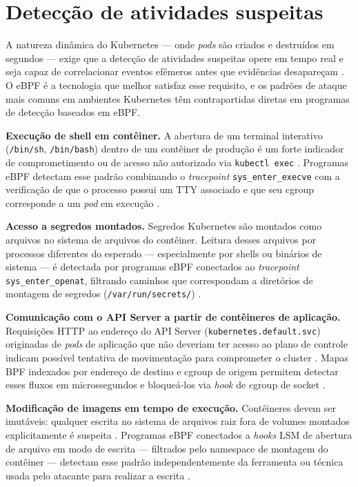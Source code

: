 \section{Detecção de atividades suspeitas}

A natureza dinâmica do Kubernetes — onde \textit{pods} são criados e destruídos
em segundos — exige que a detecção de atividades suspeitas opere em tempo real e
seja capaz de correlacionar eventos efêmeros antes que evidências desapareçam
\cite{majors2022}.
O eBPF é a tecnologia que melhor satisfaz esse requisito, e os padrões de ataque
mais comuns em ambientes Kubernetes têm contrapartidas diretas em programas de
detecção baseados em eBPF.

\textbf{Execução de shell em contêiner.}
A abertura de um terminal interativo (\texttt{/bin/sh}, \texttt{/bin/bash})
dentro de um contêiner de produção é um forte indicador de comprometimento ou
de acesso não autorizado via \texttt{kubectl exec} \cite{cassagnes2020}.
Programas eBPF detectam esse padrão combinando o \textit{tracepoint}
\texttt{sys\_enter\_execve} com a verificação de que o processo possui um TTY
associado e que seu cgroup corresponde a um \textit{pod} em execução
\cite{linuxkernel2024}.

\textbf{Acesso a segredos montados.}
Segredos Kubernetes são montados como arquivos no sistema de arquivos do contêiner.
Leitura desses arquivos por processos diferentes do esperado — especialmente por
shells ou binários de sistema — é detectada por programas eBPF conectados ao
\textit{tracepoint} \texttt{sys\_enter\_openat}, filtrando caminhos que
correspondam a diretórios de montagem de segredos (\texttt{/var/run/secrets/})
\cite{gregg2019}.

\textbf{Comunicação com o API Server a partir de contêineres de aplicação.}
Requisições HTTP ao endereço do API Server (\texttt{kubernetes.default.svc})
originadas de \textit{pods} de aplicação que não deveriam ter acesso ao plano
de controle indicam possível tentativa de movimentação para comprometer o cluster
\cite{beyer2016}.
Mapas BPF indexados por endereço de destino e cgroup de origem permitem detectar
esses fluxos em microssegundos e bloqueá-los via \textit{hook} de cgroup de socket
\cite{linuxkernel2024}.

\textbf{Modificação de imagens em tempo de execução.}
Contêineres devem ser imutáveis: qualquer escrita no sistema de arquivos raiz
fora de volumes montados explicitamente é suspeita \cite{gregg2020}.
Programas eBPF conectados a \textit{hooks} LSM de abertura de arquivo em modo de
escrita — filtrados pelo namespace de montagem do contêiner — detectam esse padrão
independentemente da ferramenta ou técnica usada pelo atacante para realizar a
escrita \cite{linuxkernel2024}.

